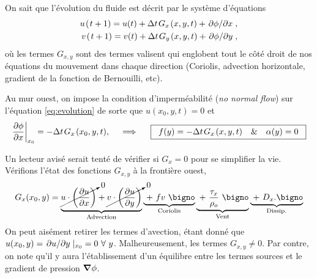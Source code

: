 \documentclass[10pt]{article}
\numberwithin{equation}{section}
\newcommand{\pt}{\hspace{1pt}} %
\begin{document}
On sait que l'évolution du fluide est décrit par le système d'équations
\begin{subequations}
\begin{align}
u\pt (\pt t+1)  = u(t) + \Delta t \pt G_x\pt(x,y,t) + \pdv*{\phi}{x}, \label{eq:evolution}\\
v\pt (\pt t+1)  = v(t) + \Delta t \pt G_y\pt(x,y,t) + \pdv*{\phi}{y},
\end{align}
\end{subequations}
où les termes \(G_{x,y}\) sont des termes valisent qui englobent tout le côté droit de nos équations du mouvement dans chaque direction (Coriolis, advection horizontale, gradient de la fonction de Bernouilli, etc).\bigskip

Au mur ouest, on impose la condition d'imperméabilité (\emph{no normal flow}) sur l'équation \ref{eq:evolution} de sorte que \(u(x_0,y,t) = 0\) et
\begin{equation}
\eval{\pdv{\phi}{x}}_{x_0} = -\Delta t \pt G_x\pt(x_0,y,t),
\hspace{0.5cm}\Longrightarrow\hspace{0.5cm}
\boxed{\hspace{0.2cm}f(y) = -\Delta t \pt G_x\pt(x,y,t) \hspace{0.35cm}\&\hspace{0.35cm} \alpha(y) = 0 \hspace{0.2cm}}
\end{equation}

Un lecteur avisé serait tenté de vérifier si \(G_x = 0\) pour se simplifier la vie.
Vérifions l'état des fonctions \(G_{x,y}\) à la frontière ouest,
\begin{equation}
G_x(x_0,y) = \underbrace{\cancelto{0}{u\cdot\qty(\pdv{u}{x})} + \cancelto{0}{v\cdot\qty(\pdv{u}{y})}}_\text{Advection}
\underbrace{\ +\ f v \ \bigno}_\text{Coriolis}
\underbrace{\ +\ \frac{\tau_x}{\rho_o}\ \bigno}_\text{Vent}
\underbrace{\ +\ D_x. \bigno}_\text{Dissip.}
\end{equation}
On peut aisément retirer les termes d'avection, étant donné que \({u(x_0,y)=\pdv*{u}{y}|_{x_0} = 0\ \forall\ y}\).
Malheureusement, les termes \({G_{x,y} \neq 0}\).
Par contre, on note qu'il y aura l'établissement d'un équilibre entre les termes sources et le gradient de pression \(\gradient{\phi}\).

\printbibliography
\end{document}

